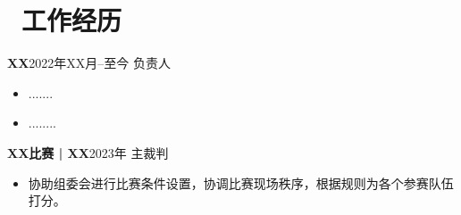 \documentclass[11pt]{article}
\begin{document}


\section{\texorpdfstring{\makebox[\widthof{\faUsers}][c]{\color{ZZU_BLUE}\faUsers}\ 工作经历}{工作经历}}
 {\bf XX}\hfill 2022年XX月\hspace{0.5em}--\hspace{0.5em}至今
\newline
负责人
\begin{itemize}
    \item .......
    \item ........
\end{itemize}

{\bf XX比赛\hspace{0.2em} | \hspace{0.2em}XX}\hfill 2023年
\newline
主裁判
\begin{itemize}
    \item 协助组委会进行比赛条件设置，协调比赛现场秩序，根据规则为各个参赛队伍打分。
\end{itemize}
\end{document}
